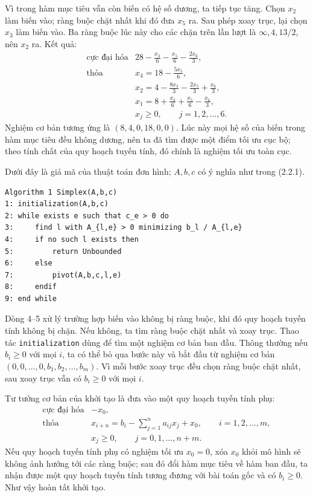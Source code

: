 \documentclass[11pt]{article}
\begin{document}
Vì trong hàm mục tiêu vẫn còn biến có hệ số dương, ta tiếp tục tăng. Chọn
\(x_2\) làm biến vào; ràng buộc chặt nhất khi đó đưa \(x_5\) ra. Sau phép
xoay trục, lại chọn \(x_3\) làm biến vào. Ba ràng buộc lúc này cho các chặn
trên lần lượt là \(\infty,4,13/2\), nên \(x_2\) ra. Kết quả:
\[
\begin{array}{ll}
\text{cực đại hóa} &
  28-\frac{x_3}{6}-\frac{x_5}{6}-\frac{2x_6}{3},\\[0.4em]
\text{thỏa} &
  x_4=18-\frac{5x_5}{6},\\[0.4em]
& x_2=4-\frac{8x_3}{3}-\frac{2x_5}{3}+\frac{x_6}{3},\\[0.4em]
& x_1=8+\frac{x_3}{6}+\frac{x_5}{6}-\frac{x_6}{3},\\[0.4em]
& x_j\ge 0,\qquad j=1,2,\ldots,6.
\end{array}
\]
Nghiệm cơ bản tương ứng là \((8,4,0,18,0,0)\). Lúc này mọi hệ số của biến
trong hàm mục tiêu đều không dương, nên ta đã tìm được một điểm tối ưu cục
bộ; theo tính chất của quy hoạch tuyến tính, đó chính là nghiệm tối ưu toàn
cục.

Dưới đây là giả mã của thuật toán đơn hình; \(A,b,c\) có ý nghĩa như trong
(2.2.1).

\begin{verbatim}
Algorithm 1 Simplex(A,b,c)
1: initialization(A,b,c)
2: while exists e such that c_e > 0 do
3:     find l with A_{l,e} > 0 minimizing b_l / A_{l,e}
4:     if no such l exists then
5:         return Unbounded
6:     else
7:         pivot(A,b,c,l,e)
8:     endif
9: end while
\end{verbatim}

Dòng 4--5 xử lý trường hợp biến vào không bị ràng buộc, khi đó quy hoạch tuyến
tính không bị chặn. Nếu không, ta tìm ràng buộc chặt nhất và xoay trục.
Thao tác \texttt{initialization} dùng để tìm một nghiệm cơ bản ban đầu. Thông
thường nếu \(b_i\ge 0\) với mọi \(i\), ta có thể bỏ qua bước này và bắt đầu
từ nghiệm cơ bản \((0,0,\ldots,0,b_1,b_2,\ldots,b_m)\). Vì mỗi bước xoay trục
đều chọn ràng buộc chặt nhất, sau xoay trục vẫn có \(b_i\ge 0\) với mọi \(i\).

Tư tưởng cơ bản của khởi tạo là đưa vào một quy hoạch tuyến tính phụ:
\[
\begin{array}{ll}
\text{cực đại hóa} & -x_0,\\
\text{thỏa} &
  x_{i+n}=b_i-\displaystyle\sum_{j=1}^{n}a_{ij}x_j+x_0,
  \qquad i=1,2,\ldots,m,\\
& x_j\ge 0,\qquad j=0,1,\ldots,n+m.
\end{array}
\]
Nếu quy hoạch tuyến tính phụ có nghiệm tối ưu \(x_0=0\), xóa \(x_0\) khỏi mô
hình sẽ không ảnh hưởng tới các ràng buộc; sau đó đổi hàm mục tiêu về hàm ban
đầu, ta nhận được một quy hoạch tuyến tính tương đương với bài toán gốc và có
\(b_i\ge 0\). Như vậy hoàn tất khởi tạo.
\end{document}
